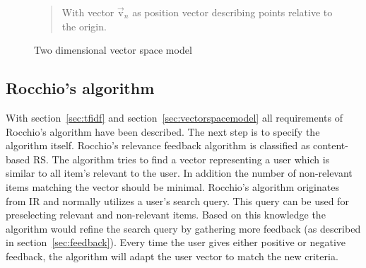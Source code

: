 \begin{figure}[h]
    \begin{quote}
        With vector $\vec{\text{v}}_n$ as position vector describing points relative to the origin.
    \end{quote}
    \center

    \caption{Two dimensional vector space model}
    \label{fig:vectorspacemodel}
\end{figure}


\iffalse
\subsubsection{Parametric and zone indices}
\label{sec:parametricandzoneindices}
\fi


\FloatBarrier

\subsection{Rocchio's algorithm}
\label{sec:rocchio}
With section~\ref{sec:tfidf} and section~\ref{sec:vectorspacemodel} all requirements of Rocchio's algorithm have been described.\citep[p.~178]{manning:2009}
The next step is to specify the algorithm itself.
Rocchio's relevance feedback algorithm is classified as content-based RS.\citep[p.~92]{lops:2011}
The algorithm tries to find a vector representing a user which is similar to all item's relevant to the user.
In addition the number of non-relevant items matching the vector should be minimal.
Rocchio's algorithm originates from IR and normally utilizes a user's search query.
This query can be used for preselecting relevant and non-relevant items.
Based on this knowledge the algorithm would refine the search query by gathering more feedback (as described in section~\ref{sec:feedback}).
\citep[p.~178-182]{manning:2009}
Every time the user gives either positive or negative feedback, the algorithm will adapt the user vector to match the new criteria.\citep[p.~387-388]{pazzani:2007}

